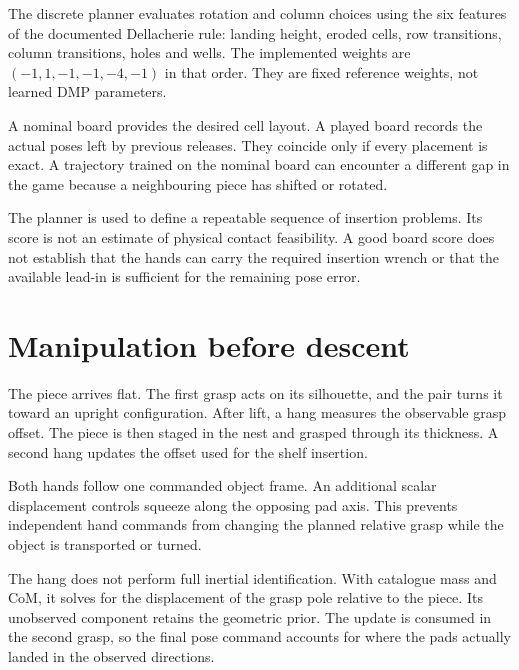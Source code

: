 The discrete planner evaluates rotation and column choices using the six features of the documented Dellacherie rule: landing height, eroded cells, row transitions, column transitions, holes and wells. The implemented weights are $(-1,1,-1,-1,-4,-1)$ in that order. They are fixed reference weights, not learned DMP parameters.

A nominal board provides the desired cell layout. A played board records the actual poses left by previous releases. They coincide only if every placement is exact. A trajectory trained on the nominal board can encounter a different gap in the game because a neighbouring piece has shifted or rotated.


The planner is used to define a repeatable sequence of insertion problems. Its score is not an estimate of physical contact feasibility. A good board score does not establish that the hands can carry the required insertion wrench or that the available lead-in is sufficient for the remaining pose error.

\section{Manipulation before descent}

The piece arrives flat. The first grasp acts on its silhouette, and the pair turns it toward an upright configuration. After lift, a hang measures the observable grasp offset. The piece is then staged in the nest and grasped through its thickness. A second hang updates the offset used for the shelf insertion.

Both hands follow one commanded object frame. An additional scalar displacement controls squeeze along the opposing pad axis. This prevents independent hand commands from changing the planned relative grasp while the object is transported or turned.

The hang does not perform full inertial identification. With catalogue mass and CoM, it solves for the displacement of the grasp pole relative to the piece. Its unobserved component retains the geometric prior. The update is consumed in the second grasp, so the final pose command accounts for where the pads actually landed in the observed directions.

